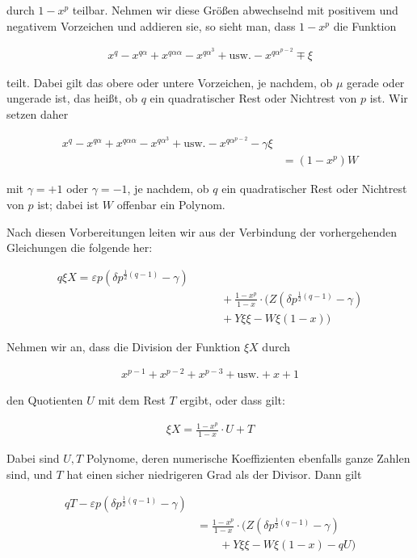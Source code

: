 durch $1-x^p$ teilbar. Nehmen wir diese Größen abwechselnd mit positivem und negativem Vorzeichen und addieren sie, so sieht man, dass $1-x^p$ die Funktion

\[
\begin{aligned}
x^q-x^{q\alpha}+x^{q\alpha\alpha}-x^{q\alpha^3}+\text{usw.}-x^{q\alpha^{p-2}}\mp\xi
\end{aligned}
\]

teilt. Dabei gilt das obere oder untere Vorzeichen, je nachdem, ob $\mu$ gerade oder ungerade ist, das heißt, ob $q$ ein quadratischer Rest oder Nichtrest von $p$ ist. Wir setzen daher

\[
\begin{aligned}
x^q-x^{q\alpha}+x^{q\alpha\alpha}- x^{q\alpha^3}+\text{usw.}-x^{q\alpha^{p-2}}-\gamma\xi\\&=(1-x^p)W
\end{aligned}
\]

mit $\gamma=+1$ oder $\gamma=-1$, je nachdem, ob $q$ ein quadratischer Rest oder Nichtrest von $p$ ist; dabei ist $W$ offenbar ein Polynom.


Nach diesen Vorbereitungen leiten wir aus der Verbindung der vorhergehenden Gleichungen die folgende her:

\[
\begin{aligned}
q\xi X=\varepsilon p(\delta p^{\frac12(q-1)}-\gamma)\\&\qquad+\frac{1-x^p}{1-x}\cdot(Z(\delta p^{\frac12(q-1)}-\gamma)\\&\qquad+Y\xi\xi-W\xi(1-x))
\end{aligned}
\]

Nehmen wir an, dass die Division der Funktion $\xi X$ durch

\[
\begin{aligned}
x^{p-1}+x^{p-2}+x^{p-3}+\text{usw.}+x+1
\end{aligned}
\]

den Quotienten $U$ mit dem Rest $T$ ergibt, oder dass gilt:

\[
\begin{aligned}
\xi X=\frac{1-x^p}{1-x}\cdot U+T
\end{aligned}
\]

Dabei sind $U,T$ Polynome, deren numerische Koeffizienten ebenfalls ganze Zahlen sind, und $T$ hat einen sicher niedrigeren Grad als der Divisor. Dann gilt

\[
\begin{aligned}
qT-\varepsilon p(\delta p^{\frac12(q-1)}-\gamma)\\&=\frac{1-x^p}{1-x}\cdot(Z(\delta p^{\frac12(q-1)}-\gamma)\\&\qquad+Y\xi\xi-W\xi(1-x)-qU)
\end{aligned}
\]

